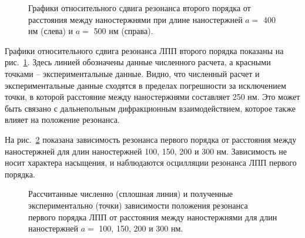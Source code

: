 \begin{figure}
\begin{subfigure}{.5\textwidth}
\end{subfigure}
\caption{Графики относительного сдвига резонанса второго порядка от расстояния между наностержнями при длине наностержней $ a = $ 400 нм (слева) и $ a = $ 500 нм (справа).}
\label{img:ashift}
\end{figure}

Графики относительного сдвига резонанса ЛПП второго порядка показаны на рис.~\ref{img:ashift}. Здесь линией обозначены данные численного расчета, а красными точками -- экспериментальные данные. Видно, что численный расчет и экспериментальные данные сходятся в пределах погрешности за исключением точки, в которой расстояние между наностержнями составляет 250 нм. Это может быть связано с дальнепольным дифракционным взаимодействием, которое также влияет на положение резонанса.

На рис.~\ref{img:1res} показана зависимость резонанса первого порядка от расстояния между наностержней для длин наностержней 100, 150, 200 и 300 нм. Зависимость не носит характера насыщения, и наблюдаются осцилляции резонанса ЛПП первого порядка. 
\begin{figure}
\caption{Рассчитанные численно (сплошная линия) и полученные экспериментально (точки) зависимости положения резонанса первого порядка ЛПП от расстояния между наностержнями для длин наностержней $ a = $ 100, 150, 200 и 300 нм.}
\label{img:1res}
\end{figure}

